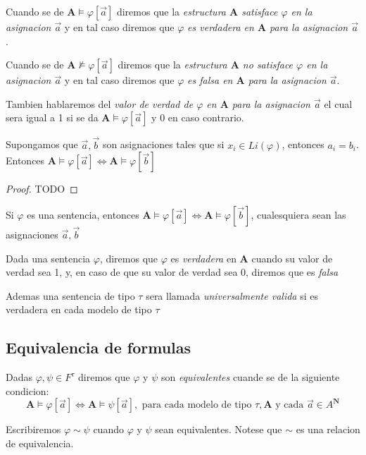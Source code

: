 \begin{definition}
  Cuando se de $\mathbf{A}\models\varphi[\vec{a}]$ diremos que la \emph{estructura $\mathbf{A}$ satisface $\varphi$ en la asignacion $\vec{a}$} y en tal caso
  diremos que $\varphi$ \emph{es verdadera en $\mathbf{A}$ para la asignacion $\vec{a}$}.

  Cuando se de $\mathbf{A}\not\models\varphi[\vec{a}]$ diremos que la \emph{estructura $\mathbf{A}$ no satisface $\varphi$ en la asignacion $\vec{a}$} y en tal caso
  diremos que $\varphi$ \emph{es falsa en $\mathbf{A}$ para la asignacion $\vec{a}$}.

  Tambien hablaremos del \emph{valor de verdad de $\varphi$ en $\mathbf{A}$ para la asignacion $\vec{a}$} el cual sera 
  igual a 1 si se da $\mathbf{A}\models\varphi[\vec{a}]$ y 0 en caso contrario.
\end{definition}

\begin{lemma}
  Supongamos que $\vec{a}, \vec{b}$ son asignaciones tales que si $x_i \in Li(\varphi)$, entonces $a_i = b_i$. Entonces
  $\mathbf{A}\models\varphi[\vec{a}] \iff \mathbf{A}\models\varphi[\vec{b}]$
\end{lemma}
\begin{proof}
  TODO
\end{proof}
\begin{corollary}
  Si $\varphi$ es una sentencia, entonces $\mathbf{A}\models\varphi[\vec{a}] \iff \mathbf{A}\models\varphi[\vec{b}]$, cualesquiera sean 
  las asignaciones $\vec{a}, \vec{b}$
\end{corollary}

\begin{definition}
  Dada una sentencia $\varphi$, diremos que $\varphi$ es \emph{verdadera} en $\mathbf{A}$ cuando su valor de verdad sea 1, y, en caso de que 
  su valor de verdad sea 0, diremos que es \emph{falsa}

  Ademas una sentencia de tipo $\tau$ sera llamada \emph{universalmente valida} si es verdadera en cada modelo de tipo $\tau$
\end{definition}

\subsection{Equivalencia de formulas}
\begin{definition}
  Dadas $\varphi, \psi \in F^\tau$ diremos que $\varphi$ y $\psi$ son \emph{equivalentes} cuande se de la siguiente condicion:
  $$
  \mathbf{A} \models \varphi[\vec{a}] \iff \mathbf{A} \models \psi[\vec{a}], \text{ para cada modelo de tipo } \tau, \mathbf{A} \text{ y cada } \vec{a} \in A^\mathbf{N}
  $$  
  
  Escribiremos $\varphi \sim \psi$ cuando $\varphi$ y $\psi$ sean equivalentes. Notese que $\sim$ es una relacion de equivalencia.
\end{definition}

